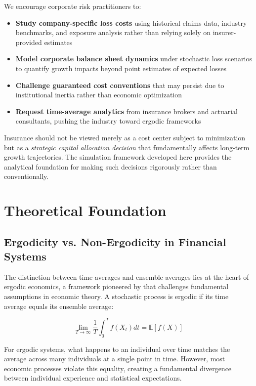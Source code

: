 \documentclass[11pt,letterpaper]{article}
\newcommand{\E}{\mathbb{E}}
\begin{document}
We encourage corporate risk practitioners to:
\begin{itemize}
    \item \textbf{Study company-specific loss costs} using historical claims data, industry benchmarks, and exposure analysis rather than relying solely on insurer-provided estimates
    \item \textbf{Model corporate balance sheet dynamics} under stochastic loss scenarios to quantify growth impacts beyond point estimates of expected losses
    \item \textbf{Challenge guaranteed cost conventions} that may persist due to institutional inertia rather than economic optimization
    \item \textbf{Request time-average analytics} from insurance brokers and actuarial consultants, pushing the industry toward ergodic frameworks
\end{itemize}

Insurance should not be viewed merely as a cost center subject to minimization but as a \emph{strategic capital allocation decision} that fundamentally affects long-term growth trajectories. The simulation framework developed here provides the analytical foundation for making such decisions rigorously rather than conventionally.

\section{Theoretical Foundation}

\subsection{Ergodicity vs. Non-Ergodicity in Financial Systems}

The distinction between time averages and ensemble averages lies at the heart of ergodic economics, a framework pioneered by \citet{peters2019ergodicity} that challenges fundamental assumptions in economic theory. A stochastic process is ergodic if its time average equals its ensemble average:

\begin{equation}
\lim_{T \to \infty} \frac{1}{T} \int_0^T f(X_t) dt = \E[f(X)]
\end{equation}

For ergodic systems, what happens to an individual over time matches the average across many individuals at a single point in time. However, most economic processes violate this equality, creating a fundamental divergence between individual experience and statistical expectations.
\end{document}
